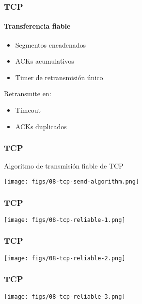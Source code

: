 \documentclass[letter]{beamer}
\begin{document}
\begin{frame}
  \frametitle{TCP}
  \framesubtitle{Transferencia fiable}

  \begin{itemize}
    \item Segmentos encadenados
    \item ACKs acumulativos
    \item Timer de retransmisión único
  \end{itemize}
  Retransmite en:
  \begin{itemize}
    \item Timeout
    \item ACKs duplicados
  \end{itemize}


\end{frame}

\begin{frame}
  \frametitle{TCP}

  Algoritmo de transmisión fiable de TCP
  \begin{center}
    \texttt{[image: figs/08-tcp-send-algorithm.png]}
  \end{center}

\end{frame}

\begin{frame}
  \frametitle{TCP}

  \begin{center}
    \texttt{[image: figs/08-tcp-reliable-1.png]}
  \end{center}

\end{frame}


\begin{frame}
  \frametitle{TCP}

  \begin{center}
    \texttt{[image: figs/08-tcp-reliable-2.png]}
  \end{center}

\end{frame}


\begin{frame}
  \frametitle{TCP}

  \begin{center}
    \texttt{[image: figs/08-tcp-reliable-3.png]}
  \end{center}

\end{frame}
\end{document}
